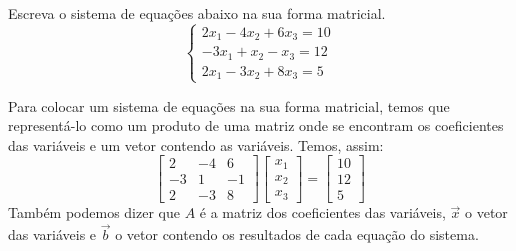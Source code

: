 \begin{exeresol}
Escreva o sistema de equações abaixo na sua forma matricial.
\begin{equation}
 \left\{
  \begin{array}{ll}
    2x_1 - 4x_2 + 6x_3 = 10 \\
    -3x_1 + x_2 - x_3 = 12 \\
    2x_1 - 3x_2 + 8x_3 = 5
  \end{array}\right.
\end{equation}
\end{exeresol}
\begin{resol}
Para colocar um sistema de equações na sua forma matricial, temos que representá-lo como um produto de uma matriz onde se encontram os coeficientes das variáveis e um vetor contendo as variáveis. Temos, assim:
\begin{equation}
 \left[
  \begin{array}{ccc}
    2 & -4 & 6  \\
    -3 & 1 & -1  \\
    2 & -3 & 8
  \end{array}
\right]
\left[
  \begin{array}{c}
   x_1 \\
   x_2 \\
   x_3
  \end{array}
  \right] =
\left[
  \begin{array}{c}
   10 \\
   12 \\
   5
  \end{array}
\right]
\end{equation}
Também podemos dizer que $A$ é a matriz dos coeficientes das variáveis, $\vec{x}$ o vetor das variáveis e $\vec{b}$ o vetor contendo os resultados de cada equação do sistema.
\end{resol}













